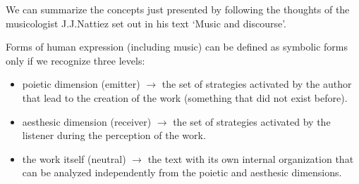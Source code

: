 We can summarize the concepts just presented by following the thoughts of the musicologist J.J.Nattiez set out in his text `Music and discourse'.

Forms of human expression (including music) can be defined as symbolic forms only if we recognize three levels:

\begin{itemize}
\tightlist
\item poietic dimension (emitter) \(\rightarrow\) the set of strategies activated by the author that lead to the creation of the work (something that did not exist before).
\item aesthesic dimension (receiver) \(\rightarrow\) the set of strategies activated by the listener during the perception of the work.
\item the work itself (neutral) \(\rightarrow\) the text with its own internal organization that can be analyzed independently from the poietic and aesthesic dimensions.
\end{itemize}

